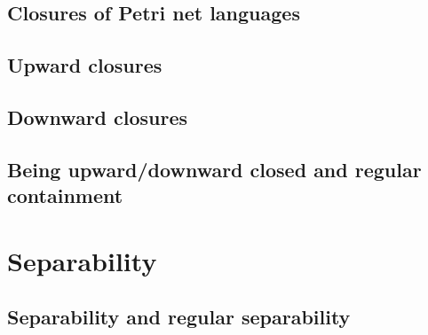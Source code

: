 \documentclass%
[%
    a4paper,                 %
    11pt,                    %
    parskip=half-,           %
    numbers=noenddot,        %
    twoside,                 %
    fleqn,                   %
    toc=chapterentrywithdots,%
    cleardoublepage=plain,   %
]
{style/smbook}
\begin{document}
    

    \chapter{Closures of Petri net languages}%
    \label{Chapter:Closures}%
    \chaptertoc%
        
        
        \clearpage
        
        \clearpage
        

    \chapter{Upward closures}%
    \label{Chapter:UC}%
    \chaptertoc%
        
        
        \clearpage
        
        \clearpage
        
        \clearpage
        

    \chapter{Downward closures}%
    \label{Chapter:DC}%
    \chaptertoc%
        
        
        \clearpage
        
        \clearpage
        
        \clearpage
        

    \chapter{Being upward/downward closed and regular containment}%
    \label{Chapter:BeingUCDC}%
        
        \clearpage
        


\part{Separability}%
\label{Part:Separability}%

    

    \chapter{Separability and regular separability}%
    \label{Chapter:Separability}%
    \chaptertoc%
        
        
        \clearpage
        
        \clearpage
        
\end{document}
